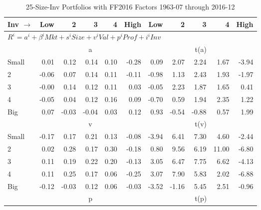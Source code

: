 
\begin{table}[!ht]
\centering
\caption{25-Size-Inv Portfolios with FF2016 Factors 1963-07 through 2016-12}
\begin{tabular}{lrrrrrrrrrr}
  \toprule
    Inv $\rightarrow$ & Low & 2 & 3 & 4 & High & Low & 2 & 3 & 4 & High \\ 
  \midrule
  \multicolumn{11}{l}{$R^i=a^i+\beta^iMkt+s^iSize+v^iVal+p^iProf+i^iInv$} \\

  
    
      & \multicolumn{5}{c}{a} & \multicolumn{5}{c}{t(a)}
    
    \\
      \cmidrule(r){2-6} \cmidrule(r){7-11}

    Small   & 0.01  & 0.12  & 0.14  & 0.10  & -0.28  & 0.09  & 2.07  & 2.24  & 1.67  & -3.94  \\
         2  & -0.06  & 0.07  & 0.14  & 0.11  & -0.11  & -0.98  & 1.13  & 2.43  & 1.93  & -1.97  \\
         3  & -0.00  & 0.14  & 0.12  & 0.11  & 0.03  & -0.05  & 2.23  & 1.87  & 1.65  & 0.41  \\
         4  & -0.05  & 0.04  & 0.12  & 0.16  & 0.09  & -0.70  & 0.59  & 1.94  & 2.35  & 1.22  \\
    Big     & 0.07  & -0.03  & -0.04  & 0.03  & 0.12  & 0.93  & -0.54  & -0.88  & 0.57  & 1.99  \\

  
    
      & \multicolumn{5}{c}{v} & \multicolumn{5}{c}{t(v)}
    
    \\
      \cmidrule(r){2-6} \cmidrule(r){7-11}

    Small   & -0.17  & 0.17  & 0.21  & 0.13  & -0.08  & -3.94  & 6.41  & 7.30  & 4.60  & -2.44  \\
         2  & 0.02  & 0.28  & 0.17  & 0.30  & -0.18  & 0.80  & 9.56  & 6.19  & 11.00  & -6.80  \\
         3  & 0.11  & 0.19  & 0.22  & 0.20  & -0.13  & 3.05  & 6.47  & 7.75  & 6.62  & -4.13  \\
         4  & 0.11  & 0.25  & 0.17  & 0.06  & -0.25  & 3.07  & 7.90  & 5.83  & 2.02  & -6.88  \\
    Big     & -0.12  & -0.03  & 0.12  & 0.06  & -0.03  & -3.52  & -1.16  & 5.45  & 2.51  & -0.96  \\

  
    
      & \multicolumn{5}{c}{p} & \multicolumn{5}{c}{t(p)}
    

\end{tabular}
\end{table}
